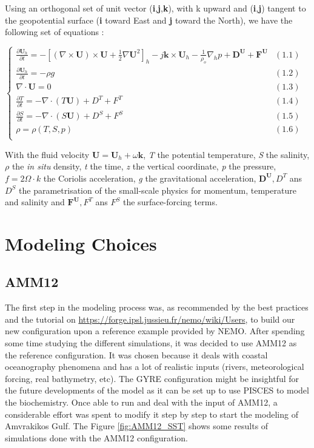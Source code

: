\documentclass[english]{PFeENSTA}
\begin{document}
{Using an orthogonal set of unit vector (\textbf{i},\textbf{j},\textbf{k}), with k upward and (\textbf{i},\textbf{j}) tangent to the geopotential surface (\textbf{i} toward East and \textbf{j} toward the North), we have the following set of equations : 

$
 \begin{cases}
\frac{\partial \textbf{U}_h}{\partial t} = -[( \nabla\times\textbf{U})\times\textbf{U} + \frac{1}{2} \nabla\textbf{U}^2]_h -j\textbf{k} \times \textbf{U}_h - \frac{1}{\rho_o}  \nabla_h p + \textbf{D}^{\textbf{U}} + \textbf{F}^{\textbf{U}} & (1.1)\\
 \frac{\partial \textbf{U}_h}{\partial t} = - \rho g & (1.2) \\
\nabla \cdot \textbf{U} = 0  &  (1.3)\\
\frac{\partial T}{\partial t}=-\nabla \cdot (T\textbf{U}) + D^T +F^T  &  (1.4)\\
\frac{\partial S}{\partial t}=-\nabla \cdot (S \textbf{U}) + D^S+F^S   &  (1.5)\\
\rho = \rho(T,S,p)  &  (1.6)\\
\end{cases} 
$

With the fluid velocity $\textbf{U} = \textbf{U}_h + \omega \textbf{k}$, \textit{T} the potential temperature, \textit{S} the salinity, $\rho$ the \textit{in situ} density, \textit{t} the time, \textit{z} the vertical coordinate, \textit{p} the pressure, $ f=2\Omega\cdot k $ the Coriolis acceleration, \textit{g} the gravitational acceleration, $\textbf{D}^\textbf{U}, D^T$ ans $D^S$ the parametrisation of the small-scale physics for momentum, temperature and salinity and $\textbf{F}^\textbf{U}, F^T$ ans $F^S$ the surface-forcing terms.



\section{Modeling Choices}


\subsection{AMM12}

The first step in the modeling process was, as recommended by the best practices and the tutorial on \url{https://forge.ipsl.jussieu.fr/nemo/wiki/Users}, to build our new configuration upon a reference example provided by NEMO.
After spending some time studying the different simulations, it was decided to use AMM12 as the reference configuration. It was chosen because it deals with coastal oceanography phenomena and has a lot of realistic inputs (rivers, meteorological forcing, real bathymetry, etc). The GYRE configuration might be insightful for the future developments of the model as it can be set up to use PISCES to model the biochemistry.
Once able to run and deal with the input of AMM12, a considerable effort was spent to modify it step by step to start the modeling of Amvrakikos Gulf. The Figure \ref{fig:AMM12_SST} shows some results of simulations done with the AMM12 configuration.

}
\end{document}
